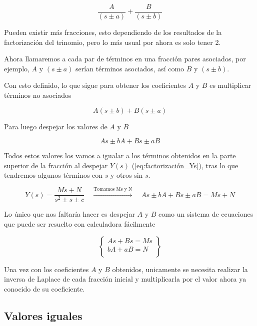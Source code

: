 \begin{equation*}
    \frac{A}{(s \pm a)} + \frac{B}{(s \pm b)}
\end{equation*}

Pueden existir más fracciones, esto dependiendo de los resultados de la factorización del trinomio, pero lo más usual por ahora es solo tener 2.

Ahora llamaremos a cada par de términos en una fracción pares asociados, por ejemplo, $A$ y $(s \pm a)$ serían términos asociados, así como $B$ y $(s \pm b)$.

Con esto definido, lo que sigue para obtener los coeficientes $A$ y $B$ es multiplicar términos no asociados

\begin{equation*}
    A(s \pm b) + B(s \pm a)
\end{equation*}

Para luego despejar los valores de $A$ y $B$

\begin{equation*}
    As \pm bA + Bs \pm aB
\end{equation*}

Todos estos valores los vamos a igualar a los términos obtenidos en la parte superior de la fracción al despejar $Y(s)$ (\autoref{eq:factorización_Ys}), tras lo que tendremos algunos términos con $s$ y otros sin $s$.

\begin{equation*}
    Y(s) = \frac{Ms + N}{s^{2} \pm s \pm c} \quad \xrightarrow{\text{Tomamos Ms y N}} \quad As \pm bA + Bs \pm aB = Ms + N
\end{equation*}

Lo único que nos faltaría hacer es despejar $A$ y $B$ como un sistema de ecuaciones que puede ser resuelto con calculadora fácilmente

\begin{equation*}
    \begin{Bmatrix}
        As + Bs = Ms \\
        bA + aB = N\\
    \end{Bmatrix}
\end{equation*}

Una vez con los coeficientes $A$ y $B$ obtenidos, unicamente se necesita realizar la inversa de Laplace de cada fracción inicial y multiplicarla por el valor ahora ya conocido de su coeficiente.

\subsection{Valores iguales}

